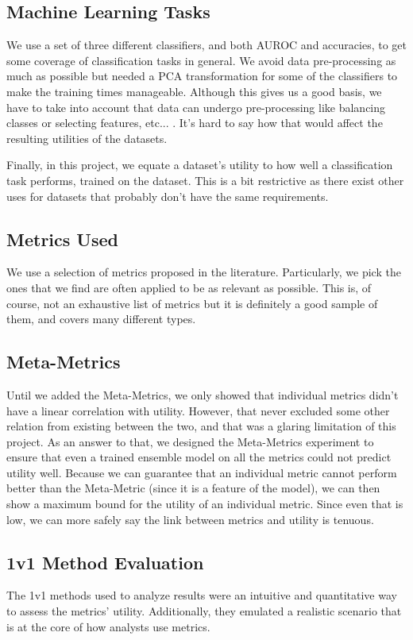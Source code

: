 \subsection{Machine Learning Tasks}
We use a set of three different classifiers, and both AUROC and accuracies, to get some coverage of classification tasks in general. We avoid data pre-processing as much as possible but needed a PCA transformation for some of the classifiers to make the training times manageable. Although this gives us a good basis, we have to take into account that data can undergo pre-processing like balancing classes or selecting features, etc... . It's hard to say how that would affect the resulting utilities of the datasets.


Finally, in this project, we equate a dataset's utility to how well a classification task performs, trained on the dataset. This is a bit restrictive as there exist other uses for datasets that probably don't have the same requirements.

\subsection{Metrics Used}
We use a selection of metrics proposed in the literature. Particularly, we pick the ones that we find are often applied to be as relevant as possible. This is, of course, not an exhaustive list of metrics but it is definitely a good sample of them, and covers many different types.

\subsection{Meta-Metrics}
Until we added the Meta-Metrics, we only showed that individual metrics didn't have a linear correlation with utility. However, that never excluded some other relation from existing between the two, and that was a glaring limitation of this project. As an answer to that, we designed the Meta-Metrics experiment to ensure that even a trained ensemble model on all the metrics could not predict utility well. Because we can guarantee that an individual metric cannot perform better than the Meta-Metric (since it is a feature of the model), we can then show a maximum bound for the utility of an individual metric. Since even that is low, we can more safely say the link between metrics and utility is tenuous.

\subsection{1v1 Method Evaluation}
The 1v1 methods used to analyze results were an intuitive and quantitative way to assess the metrics' utility. Additionally, they emulated a realistic scenario that is at the core of how analysts use metrics. 
